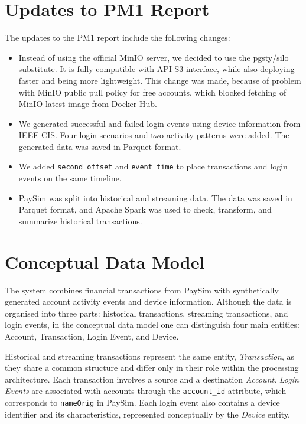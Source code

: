 \documentclass[titlepage]{article}
\begin{document}
\section{Updates to PM1 Report}

The updates to the PM1 report include the following changes:
\begin{itemize}
    \item Instead of using the official MinIO server, we decided to use the pgsty/silo substitute. It is fully compatible with API S3 interface, while also deploying faster and being more lightweight. This change was made, because of problem with MinIO public pull policy for free accounts, which blocked fetching of MinIO latest image from Docker Hub. 
    \item We generated successful and failed login events using device information from IEEE-CIS. Four login scenarios and two activity patterns were added. The generated data was saved in Parquet format.
    \item We added \texttt{second\_offset} and \texttt{event\_time} to place transactions and login events on the same timeline.
    \item PaySim was split into historical and streaming data. The data was saved in Parquet format, and Apache Spark was used to check, transform, and summarize historical transactions.
\end{itemize}


\section{Conceptual Data Model}
The system combines financial transactions from PaySim with synthetically generated account activity events and device information. Although the data is organised into three parts: historical transactions, streaming transactions, and login events, in the conceptual data model one can distinguish four main entities: Account, Transaction, Login Event, and Device. 

Historical and streaming transactions represent the same entity, \textit{Transaction}, as they share a common structure and differ only in their role within the processing architecture. Each transaction involves a source and a destination \textit{Account}. \textit{Login Events} are associated with accounts through the \texttt{account\_id} attribute, which corresponds to \texttt{nameOrig} in PaySim. Each login event also contains a device identifier and its characteristics, represented conceptually by the \textit{Device} entity.
\end{document}
